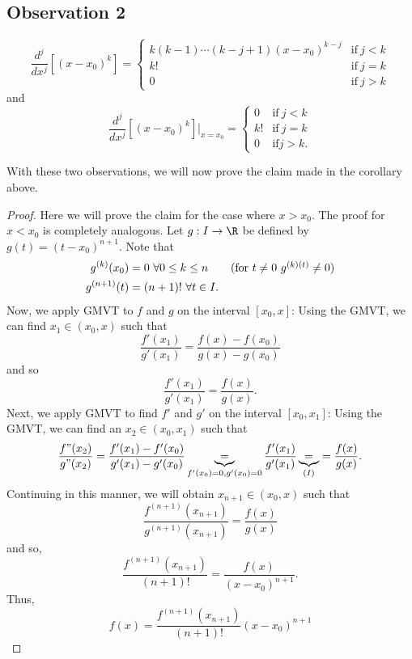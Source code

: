 \subsection{Observation 2}
\[ \frac{ d^{j} }{  d x^{j} } [(x - {x}_{0})^{k}] = 
\begin{cases}
    k (k-1) \cdots (k - j + 1) (x - {x}_{0})^{k - j} &\text{if} \ j < k \\
    k! &\text{if} \ j = k \\
    0 &\text{if} \ j > k 
\end{cases} \]
and
\[ \frac{ d^{j} }{  d x^{j} } [(x - {x}_{0})^{k}] \Big|_{ x = {x}_{0}} = 
\begin{cases}
    0 &\text{if} \ j < k \\
    k! &\text{if} \ j = k \\
    0 &\text{if} j > k. 
\end{cases} \]

With these two observations, we will now prove the claim made in the corollary above. 

\begin{proof}
Here we will prove the claim for the case where \( x > {x}_{0} \). The proof for \( x < {x}_{0} \) is completely analogous. Let \( g: I \to \R  \) be defined by \( g(t) = (t - {x}_{0})^{n+1} \). Note that 
\begin{align*}
    g^{(k)}({x}_{0}) &= 0 \ \forall 0 \leq k \leq n \tag{for \( t \neq 0  \) \( g^{(k)(t)} \neq 0  \)} \\
    g^{(n+1)}(t) &= (n + 1)! \ \forall t \in I. 
\end{align*}
Now, we apply GMVT to \( f  \) and \( g  \) on the interval \( [{x}_{0},x] \): Using the GMVT, we can find \( {x}_{1} \in ({x}_{0},x) \) such that 
\[  \frac{ f'({x}_{1}) }{ g'({x}_{1}) }  = \frac{ f(x) - f({x}_{0}) }{  g(x) - g({x}_{0}) } \]
and so 
\[  \frac{ f'({x}_{1}) }{ g'({x}_{1}) } = \frac{ f(x) }{ g(x) }. \tag{I} \]
Next, we apply GMVT to find \( f'  \) and \( g'  \) on the interval \( [{x}_{0}, {x}_{1}] \): Using the GMVT, we can find an \( {x}_{2} \in ({x}_{0}, {x}_{1}) \) such that 
\[  \frac{ f"({x}_{2}) }{ g"({x}_{2}) }  = \frac{ f'({x}_{1}) - f'({x}_{0}) }{  g'({x}_{1}) - g'({x}_{0}) } \underbrace{=}_{f'({x}_{0})=0, g'({x}_{0}) = 0} \frac{ f'({x}_{1}) }{  g'({x}_{1}) }  \underbrace{=}_{(I)} = \frac{ f(x) }{ g(x) }.  \]
Continuing in this manner, we will obtain \( {x}_{n+1} \in ({x}_{0}, x)  \) such that 
\[  \frac{ f^{(n+1)}({x}_{n+1}) }{ g^{(n+1)}({x}_{n+1}) }  = \frac{ f(x) }{  g(x) } \]
and so,
\[  \frac{ f^{(n+1)}({x}_{n+1})  }{ (n+1)! }  = \frac{ f(x) }{  (x - {x}_{0})^{n+1} }.  \]
Thus, 
\[  f(x) = \frac{ f^{(n+1)}({x}_{n+1}) }{ (n+1)! } (x - {x}_{0})^{n+1} \]
\end{proof}

